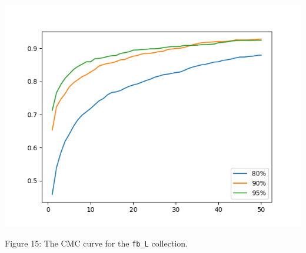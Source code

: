 \documentclass[ 12pt ]{article}
\begin{document}
\begin{enumerate}
\begin{enumerate}
                \begin{center}
                    \includegraphics[scale=0.6]{cmc_L}
                \end{center}
                \begin{center}
                    \scriptsize
                    Figure 15: The CMC curve for the \verb|fb_L| collection.
                \end{center}


\end{enumerate}
\end{enumerate}
\end{document}
